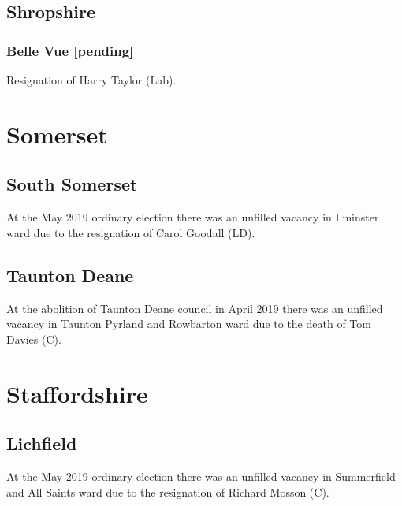 \documentclass[a4paper,openany]{book}
\begin{document}
\begin{resultsiii}
\subsection*{Shropshire}

\subsubsection*{Belle Vue \hspace*{\fill}\nolinebreak[1]%
	\enspace\hspace*{\fill}
	[pending]}


Resignation of Harry Taylor (Lab).

\section{Somerset}

\subsection*{South Somerset}

At the May 2019 ordinary election there was an unfilled vacancy in Ilminster ward due to the resignation of Carol Goodall (LD).

\subsection*{Taunton Deane}

At the abolition of Taunton Deane council in April 2019 there was an unfilled vacancy in Taunton Pyrland and Rowbarton ward due to the death of Tom Davies (C).

\section{Staffordshire}

\subsection*{Lichfield}

At the May 2019 ordinary election there was an unfilled vacancy in Summerfield and All Saints ward due to the resignation of Richard Mosson (C).


\end{resultsiii}
\end{document}
